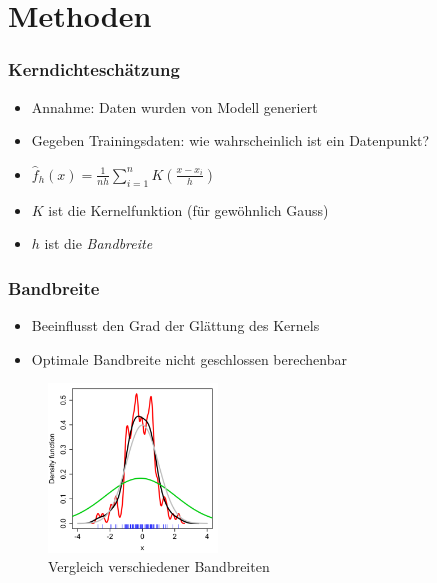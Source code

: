 \section{Methoden}

\begin{frame}
	\frametitle{Kerndichteschätzung}
	
	\begin{itemize}
		\item Annahme: Daten wurden von Modell generiert
		\item Gegeben Trainingsdaten: wie wahrscheinlich ist ein Datenpunkt?
		\item $\hat{f}_h(x) = \frac{1}{nh}\sum_{i=1}^{n} K(\frac{x - x_i}{h})$
		\item $K$ ist die Kernelfunktion (f\"ur gew\"ohnlich Gauss)
		\item $h$ ist die \textit{Bandbreite}
	\end{itemize}
\end{frame}

\begin{frame}
	\frametitle{Bandbreite}
	
	\begin{itemize}
		\item Beeinflusst den Grad der Gl\"attung des Kernels
		\item Optimale Bandbreite nicht geschlossen berechenbar
	\end{itemize}
	
	\begin{figure}[p]
		\centering
		\includegraphics[width=0.4\textwidth]{figures/Bandwidth_comparison.png}
		\caption{Vergleich verschiedener Bandbreiten}
		\label{fig:bandwidth}
	\end{figure}
\end{frame}

